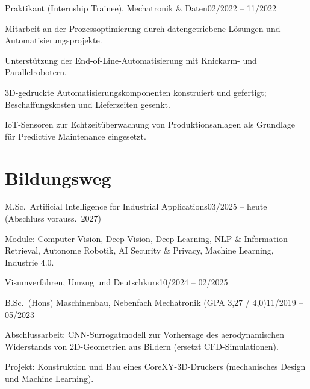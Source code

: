\documentclass[a4paper,10pt]{article}
\begin{document}
          {Praktikant (Internship Trainee), Mechatronik \& Daten}{02/2022 -- 11/2022}
  \cvpointsstart
    \item Mitarbeit an der Prozessoptimierung durch datengetriebene Lösungen und Automatisierungsprojekte.
    \item Unterstützung der End-of-Line-Automatisierung mit Knickarm- und Parallelrobotern.
    \item 3D-gedruckte Automatisierungskomponenten konstruiert und gefertigt; Beschaffungskosten und Lieferzeiten gesenkt.
    \item IoT-Sensoren zur Echtzeitüberwachung von Produktionsanlagen als Grundlage für Predictive Maintenance eingesetzt.
  \cvpointsend

\cvlistend

\section{Bildungsweg}
\cvliststart

          {M.Sc.\ Artificial Intelligence for Industrial Applications}{03/2025 -- heute (Abschluss vorauss.\ 2027)}
  \cvpointsstart
    \item Module: Computer Vision, Deep Vision, Deep Learning, NLP \& Information Retrieval, Autonome Robotik,
          AI Security \& Privacy, Machine Learning, Industrie 4.0.
  \cvpointsend

          {Visumverfahren, Umzug und Deutschkurs}{10/2024 -- 02/2025}

          {B.Sc.\ (Hons) Maschinenbau, Nebenfach Mechatronik \textup{(GPA 3,27 / 4,0)}}{11/2019 -- 05/2023}
  \cvpointsstart
    \item Abschlussarbeit: CNN-Surrogatmodell zur Vorhersage des aerodynamischen Widerstands von 2D-Geometrien aus
          Bildern (ersetzt CFD-Simulationen).
    \item Projekt: Konstruktion und Bau eines CoreXY-3D-Druckers (mechanisches Design und Machine Learning).
  \cvpointsend

\cvlistend

\end{document}
